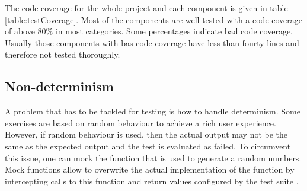 The code coverage for the whole project and each component is given in table \ref{table:testCoverage}. Most of the components are well tested with a code coverage of above 80\% in most categories. Some percentages indicate bad code coverage. Usually those components with bas code coverage have less than fourty lines and therefore not tested thoroughly. 
 
\subsection*{Non-determinism}
A problem that has to be tackled for testing is how to handle determinism. Some exercises are based on random behaviour to achieve a rich user experience. However, if random behaviour is used, then the actual output may not be the same as the expected output and the test is evaluated as failed. To circumvent this issue, one can mock the function that is used to generate a random numbers. Mock functions allow to overwrite the actual implementation of the function by intercepting calls to this function and return values configured by the test suite \cite{Jest}. 

